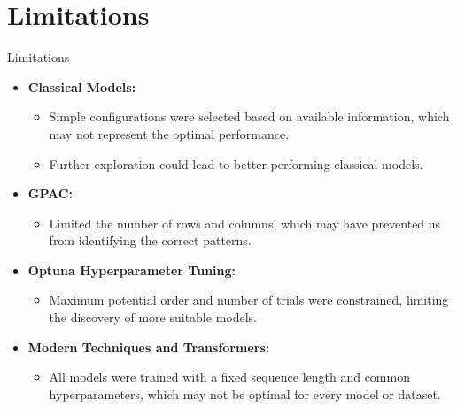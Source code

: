 \documentclass[aspectratio=16 9,10pt]{beamer}
\begin{document}
\section{Limitations}
\begin{frame}{Limitations}
    \begin{itemize}
        \item \textbf{Classical Models:}
        \begin{itemize}
            \item Simple configurations were selected based on available information, which may not represent the optimal performance.
            \item Further exploration could lead to better-performing classical models.
        \end{itemize}
        
        \item \textbf{GPAC:}
        \begin{itemize}
            \item Limited the number of rows and columns, which may have prevented us from identifying the correct patterns.
        \end{itemize}
        
        \item \textbf{Optuna Hyperparameter Tuning:}
        \begin{itemize}
            \item Maximum potential order and number of trials were constrained, limiting the discovery of more suitable models.
        \end{itemize}
        
        \item \textbf{Modern Techniques and Transformers:}
        \begin{itemize}
            \item All models were trained with a fixed sequence length and common hyperparameters, which may not be optimal for every model or dataset.
        \end{itemize}
    \end{itemize}
\end{frame}
\end{document}
